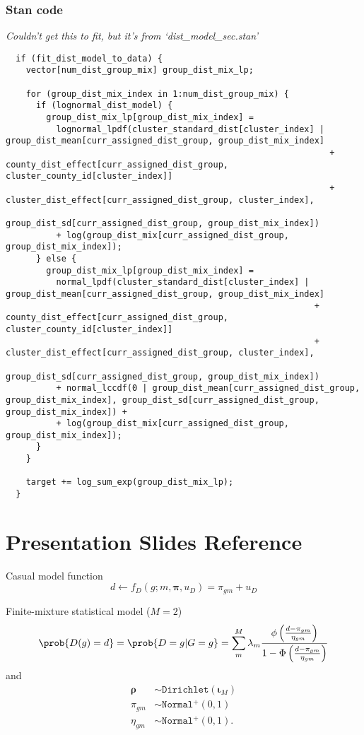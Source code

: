 \documentclass{article}
\begin{document}
\subsubsection*{Stan code}
\textit{Couldn't get this to fit, but it's from `dist_model_sec.stan'}
\begin{lstlisting}
  if (fit_dist_model_to_data) {
    vector[num_dist_group_mix] group_dist_mix_lp;
    
    for (group_dist_mix_index in 1:num_dist_group_mix) {
      if (lognormal_dist_model) {
        group_dist_mix_lp[group_dist_mix_index] =
          lognormal_lpdf(cluster_standard_dist[cluster_index] | group_dist_mean[curr_assigned_dist_group, group_dist_mix_index] 
                                                                + county_dist_effect[curr_assigned_dist_group, cluster_county_id[cluster_index]] 
                                                                + cluster_dist_effect[curr_assigned_dist_group, cluster_index],
                                                                group_dist_sd[curr_assigned_dist_group, group_dist_mix_index])
          + log(group_dist_mix[curr_assigned_dist_group, group_dist_mix_index]); 
      } else {
        group_dist_mix_lp[group_dist_mix_index] = 
          normal_lpdf(cluster_standard_dist[cluster_index] | group_dist_mean[curr_assigned_dist_group, group_dist_mix_index] 
                                                             + county_dist_effect[curr_assigned_dist_group, cluster_county_id[cluster_index]] 
                                                             + cluster_dist_effect[curr_assigned_dist_group, cluster_index],
                                                             group_dist_sd[curr_assigned_dist_group, group_dist_mix_index])  
          + normal_lccdf(0 | group_dist_mean[curr_assigned_dist_group, group_dist_mix_index], group_dist_sd[curr_assigned_dist_group, group_dist_mix_index]) +
          + log(group_dist_mix[curr_assigned_dist_group, group_dist_mix_index]); 
      }
    }
    
    target += log_sum_exp(group_dist_mix_lp);
  }
\end{lstlisting}

\section*{Presentation Slides Reference}
 Casual model function 
 \begin{equation*}  
   d \leftarrow f_D(g; m, \boldsymbol{\pi}, u_D) = \pi_{gm} + u_D 
 \end{equation*} 


 Finite-mixture statistical model ($M = 2$) 
 \begin{align*} 
 \prob{D(g) = d} = \prob{D = g | G = g} = \sum_m^M \lambda_m \frac{\phi\left(\frac{d - \pi_{gm}}{\eta_{gm}}\right)}{1 - \Phi\left(\frac{d - \pi_{gm}}{\eta_{gm}}\right)}  
 \end{align*} 
 and 
 \begin{align*} 
   \boldsymbol{\rho} &\sim \mathtt{Dirichlet}(\boldsymbol{\iota}_M) \\ 
   \pi_{gm} &\sim \mathtt{Normal^+}(0, 1) \\ 
   \eta_{gm} &\sim \mathtt{Normal^+}(0, 1). 
 \end{align*} 
\end{document}
